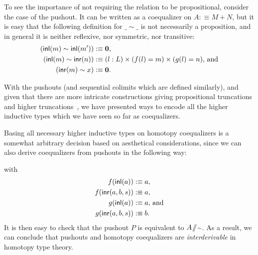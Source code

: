 To see the importance of not requiring the relation to be propositional,
consider the case of the pushout.
It can be written as a coequalizer on $A :\equiv M + N$, but it is easy that the
following definition for $\_\sim\_$ is not necessarily a proposition,
and in general it is neither reflexive, nor symmetric, nor transitive:
\begin{align*}
(\mathsf{inl}(m) \sim \mathsf{inl}(m')) &:\equiv \mathbf{0} \text{,} \\
(\mathsf{inl}(m) \sim \mathsf{inr}(n)) &:\equiv (l : L) \times (f(l) = m) \times (g(l) = n) \text{, and} \\
(\mathsf{inr}(m) \sim x) &:\equiv  \mathbf{0} \text{.}
\end{align*}

With the pushouts (and sequential colimits which are defined similarly),
and given that there are more intricate constructions giving
propositional truncations \citep{floris_proptrunc,kraustrunc} and higher truncations~\citep{rijke:join},
we have presented ways to encode all the higher inductive types
which we have seen so far as coequalizers.

\begin{remark}
Basing all necessary higher inductive types on homotopy coequalizers
is a somewhat arbitrary decision
based on aesthetical considerations, since we can also derive coequalizers
from pushouts in the following way:
\begin{center}
\end{center}
with
\begin{align*}
f(\mathsf{inl}(a)) &:\equiv a \text{,} \\
f(\mathsf{inr}(a, b, s)) &:\equiv a \text{,} \\
g(\mathsf{inl}(a)) &:\equiv a \text{, and} \\
g(\mathsf{inr}(a, b, s)) &:\equiv b \text{.}
\end{align*}
It is then easy to check that the pushout $P$ is equivalent to $A \! \sslash \! {\scriptstyle \sim}$.
As a result, we can conclude that pushouts and homotopy coequalizers
are \emph{interderivable} in homotopy type theory.
\end{remark}

